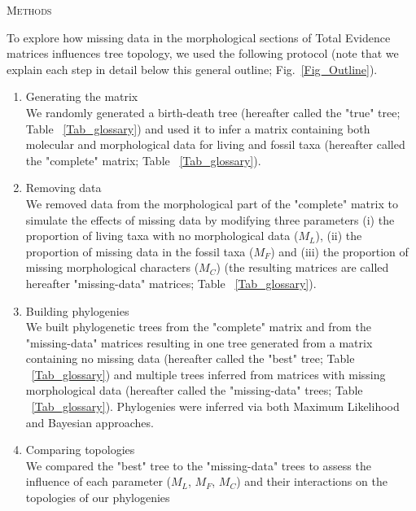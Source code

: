 \documentclass[12pt,letterpaper]{article}
\renewcommand{\section}[1]{%
\bigskip
\begin{center}
\begin{Large}
\normalfont\scshape #1
\medskip
\end{Large}
\end{center}}
\begin{document}
 
\newpage

\section{Methods} %
To explore how missing data in the morphological sections of Total Evidence matrices influences tree topology, we used the following protocol (note that we explain each step in detail below this general outline; Fig.~\ref{Fig_Outline}). %
\begin{enumerate}
\item{Generating the matrix} \label{step:generate_matrix} \\
We randomly generated a birth-death tree (hereafter called the "true" tree; Table ~\ref{Tab_glossary}) and used it to infer a matrix containing both molecular and morphological data for living and fossil taxa (hereafter called the "complete" matrix; Table ~\ref{Tab_glossary}).
\item{Removing data} \label{step:remove_data} \\
We removed data from the morphological part of the "complete" matrix to simulate the effects of missing data by modifying three parameters (i) the proportion of living taxa with no morphological data ($M_{L}$), (ii) the proportion of missing data in the fossil taxa ($M_{F}$) and (iii) the proportion of missing morphological characters ($M_{C}$) %
(the resulting matrices are called hereafter "missing-data" matrices; Table ~\ref{Tab_glossary}).
\item{Building phylogenies} \label{step:build_phylo} \\
We built phylogenetic trees from the "complete" matrix and from the "missing-data" matrices resulting in one tree generated from a matrix containing no missing data (hereafter called the "best" tree; Table ~\ref{Tab_glossary}) and multiple trees inferred from matrices with missing morphological data (hereafter called the "missing-data" trees; Table ~\ref{Tab_glossary}). Phylogenies were inferred via both Maximum Likelihood and Bayesian approaches.
\item{Comparing topologies} \label{step:compare_topo} \\
We compared the "best" tree to the "missing-data" trees to assess the influence of each parameter ($M_{L}$, $M_{F}$, $M_{C}$) and their interactions on the topologies of our phylogenies
\end{enumerate}
\end{document}
